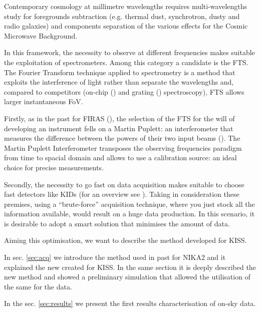 Contemporary cosmology at millimetre wavelengths requires multi-wavelengths study for foregrounds subtraction (e.g. thermal dust, synchrotron, dusty and radio galaxies) and components separation of the various effects for the Cosmic Microwave Background.

In this framework, the necessity to observe at different frequencies makes suitable the exploitation of spectrometers. Among this category a candidate is the FTS. The Fourier Transform  technique applied to spectrometry is a method that exploits the interference of light rather than separate the wavelengths and, compared to competitors (on-chip (\cite{deshima}) and grating (\cite{grating}) spectroscopy), FTS allows larger instantaneous FoV.

Firstly, as in the past for FIRAS (\cite{FIRAS}), the selection of the FTS for the will of developing an instrument fells on a Martin Puplett: an interferometer that measures the difference between the powers of their two input beams (\cite{mpi}). The Martin Puplett Interferometer transposes the observing frequencies paradigm from time to spacial domain and allows to use a calibration source: an ideal choice for precise measurements.

Secondly, the necessity to go fast on data acquisition makes suitable to choose fast detectors like KIDs (for an overview see \cite{kids}). Taking in consideration these premises, using a ``brute-force'' acquisition technique, where you just stock all the information available, would result on a huge data production. In this scenario, it is desirable to adopt a smart solution that minimises the amount of data.

Aiming this optimisation, we want to describe the method developed for KISS.

In sec. \ref{sec:acq} we introduce the method used in past for NIKA2 and it explained the new created for KISS. In the same section it is deeply described the new method and showed a preliminary simulation that allowed the utilisation of the same for the data.

In the sec. \ref{sec:results} we present the first results characterisation of on-sky data.


